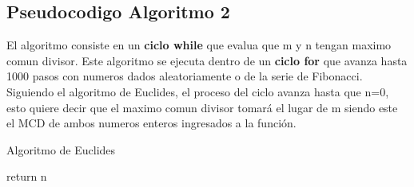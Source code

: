    \subsection{Pseudocodigo Algoritmo 2}
        El algoritmo consiste en un \textbf{ciclo while} que evalua que m y n tengan maximo comun divisor. Este algoritmo se ejecuta dentro de un \textbf{ciclo for} que avanza hasta 1000 pasos con numeros dados aleatoriamente o de la serie de Fibonacci. Siguiendo el algoritmo de Euclides, el proceso del ciclo avanza hasta que n=0, esto quiere decir que el maximo comun divisor tomará el lugar de m siendo este el MCD de ambos numeros enteros ingresados a la función.
        \begin{algorithm}
            \caption{Algoritmo de Euclides
            }\label{alg:two}
            return n\;
        \end{algorithm}
        
        
        
        
        